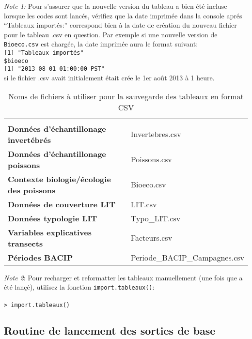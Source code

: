 \documentclass{article}
\begin{document}
\emph{Note 1:} Pour s'assurer que la nouvelle version du tableau a bien
été incluse lorsque les codes sont lancés, vérifiez que la date
imprimée dans la console aprés ``Tableaux importés:'' correspond bien à la
date de création du nouveau fichier pour le tableau .csv en
question. Par exemple si une nouvelle version de \texttt{Bioeco.csv}
est chargée, la date imprimée aura le format suivant: \\

\texttt{[1] "Tableaux importés"}\\
\texttt{\$bioeco} \\
\texttt{[1] "2013-08-01 01:00:00 PST"}\\
si le fichier .csv avait initialement était crée le 1er août 2013 à 1 heure.

\begin{table}[h]
\caption{ Noms de fichiers à utiliser pour la sauvegarde des tableaux
  en format CSV   \label{tableaucsv}}
\begin{center}
\begin{tabular}{l l}
\hline
\hline
\\
\textbf{Données d'échantillonage invertébrés} & Invertebres.csv \\
\textbf{Données d'échantillonage poissons} & Poissons.csv \\
\textbf{Contexte biologie/écologie des poissons} & Bioeco.csv \\
\textbf{Données de couverture LIT} & LIT.csv \\
\textbf{Données typologie LIT} & Typo\_LIT.csv \\
\textbf{Variables explicatives transects} & Facteurs.csv \\
\textbf{Périodes BACIP} & Periode\_BACIP\_Campagnes.csv \\
\end{tabular}
\end{center}
\end{table}

\emph{Note 2}: Pour recharger et reformatter les tableaux manuellement
(une fois que \mcode a été lançé), utilisez la fonction \texttt{import.tableaux()}: \\
\\
\texttt{> import.tableaux()}\\

   \subsection{Routine de lancement des sorties de base}
\end{document}

